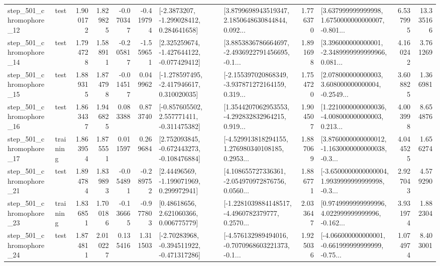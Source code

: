 \begin{tabular}{llrrrrllrlrr}
  step\_501\_chromophore\_12 &      test &      1.900172 &    1.829825 &     -0.070347 & -0.419794 &     [-2.3873207, -1.299028412, 0.284641658] &  [3.8799698943519347, 2.1850648630844844, 0.092... &       1.776370 &  [3.637999999999998, 1.6750000000000007, -0.801... &            6.537995 &         13.335166 \\
  step\_501\_chromophore\_14 &      test &      1.794728 &    1.588911 &     -0.205817 & -1.559651 &   [2.325259674, -1.427644122, -0.077429412] &  [3.8853836786664697, -2.4936922791456695, -0.1... &       1.891698 &  [3.396000000000001, -2.3489999999999966, 0.081... &            4.160242 &          3.761269 \\
  step\_501\_chromophore\_15 &      test &      1.889315 &    1.874798 &     -0.014517 &  0.049962 &   [-1.278597495, -2.417946617, 0.310020035] &  [-2.155397020868349, -3.937871272164159, 0.319... &       1.754720 &  [2.078000000000003, 3.608000000000004, -0.2549... &            3.608825 &          1.366981 \\
  step\_501\_chromophore\_16 &      test &      1.863437 &    1.946825 &      0.083388 &  0.873740 &   [-0.857605502, 2.557771411, -0.311475382] &  [1.3544207062953553, -4.292832832964215, 0.919... &       1.904507 &  [1.2210000000000036, -4.008000000000003, 0.213... &            4.003998 &          8.654876 \\
  step\_501\_chromophore\_17 &  training &      1.863954 &    1.875551 &      0.011597 &  0.269684 &   [2.752093845, -0.672443273, -0.108476884] &  [-4.529913818294155, 1.276980340108185, 0.2953... &       1.887069 &  [3.8760000000000012, -1.1630000000000038, -0.3... &            4.044525 &          1.656274 \\
  step\_501\_chromophore\_21 &      test &      1.894784 &    1.839893 &     -0.054891 & -0.289752 &     [2.44496569, -1.199071969, 0.299972941] &  [4.108655727336361, -2.054970972876756, 0.0560... &       1.886771 &  [-3.6500000000000004, 1.9939999999999998, -0.3... &            2.927043 &          4.579290 \\
  step\_501\_chromophore\_23 &  training &      1.836851 &    1.700186 &     -0.136665 & -0.977803 &      [0.48618656, 2.621060366, 0.006775779] &  [-1.2281039884148517, -4.4960782379777, 0.2570... &       2.033647 &  [0.9749999999999996, 4.022999999999996, -0.162... &            3.931974 &          1.882304 \\
  step\_501\_chromophore\_24 &      test &      1.874811 &    2.010227 &      0.135416 &  1.311503 &   [-2.70283968, -0.394511922, -0.471317286] &  [-4.576132989494016, -0.7070968603221373, -0.1... &       1.925036 &  [-4.066000000000001, -0.661999999999999, -0.75... &            1.074974 &          8.403001 \\

\end{tabular}
